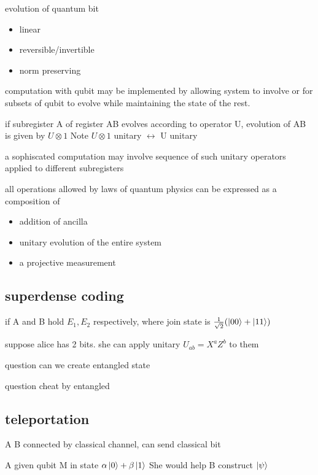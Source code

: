 \documentclass[10pt]{article}
\theoremstyle{break}
\begin{document}
evolution of quantum bit 
\begin{itemize}
    \item linear 
    \item reversible/invertible
    \item norm preserving
\end{itemize}

computation with qubit may be implemented by allowing system to involve or for subsets of qubit to evolve 
while maintaining the state of the rest.

if subregister A of register AB evolves according to operator U, evolution of AB is given by 
$U\otimes 1$ Note $U\otimes 1$ unitary $\leftrightarrow$ U unitary 

a sophiscated computation may involve sequence of such unitary operators applied to different subregisters 

all operations allowed by laws of quantum physics can be expressed as a composition of 
\begin{itemize}
    \item addition of ancilla
    \item unitary evolution of the entire system 
    \item a projective measurement
\end{itemize}

\subsection{superdense coding}
if A and B hold $E_1, E_2$ respectively, where join state is 
$\frac{1}{\sqrt{2}}(\ket{00}+\ket{11})$

suppose alice has 2 bits. she can apply unitary $U_{ab}=X^aZ^b$ to them 

question can we create entangled state

question cheat by entangled

\subsection{teleportation}
A B connected by classical channel, can send classical bit 

A given qubit M in state $\alpha\ket{0}+\beta\ket{1}$
She would help B construct $\ket{\psi}$
\end{document}
